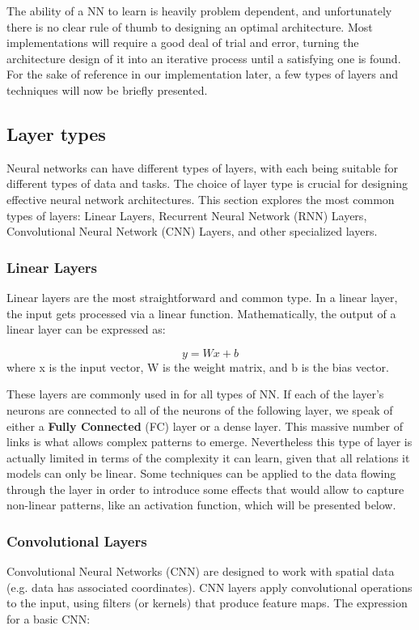 \documentclass[a4paper, 11pt]{report}
\begin{document}
The ability of a NN to learn is heavily problem dependent, and unfortunately there is no clear rule of thumb to designing an optimal architecture. Most implementations will require a good deal of trial and error, turning the architecture design of it into an iterative process until a satisfying one is found. For the sake of reference in our implementation later, a few types of layers and techniques will now be briefly presented.

\subsection{Layer types}
Neural networks can have different types of layers, with each being suitable for different types of data and tasks. The choice of layer type is crucial for designing effective neural network architectures. This section explores the most common types of layers: Linear Layers, Recurrent Neural Network (RNN) Layers, Convolutional Neural Network (CNN) Layers, and other specialized layers.
\subsubsection{Linear Layers}\label{Theory: Linear layers}
 Linear layers are the most straightforward and common type.  In a linear layer, the input gets processed via a linear function. Mathematically, the output of a linear layer can be expressed as:

 $$y=Wx+b$$
 where x is the input vector, W is the weight matrix, and b is the bias vector.

 These layers are commonly used in for all types of NN. If each of the layer's neurons are connected to all of the neurons of the following layer, we speak of either a \textbf{Fully Connected} (FC) layer or a dense layer. This massive number of links is what allows complex patterns to emerge. Nevertheless this type of layer is actually limited in terms of the complexity it can learn, given that all relations it models can only be linear. Some techniques can be applied to the data flowing through the layer in order to introduce some effects that would allow to capture non-linear patterns, like an activation function, which will be presented below.

\subsubsection{Convolutional Layers}\label{Theory: CNN layers}
 Convolutional Neural Networks (CNN) are designed to work with spatial data (e.g. data has associated coordinates). CNN layers apply convolutional operations to the input, using filters (or kernels) that produce feature maps. The expression for a basic CNN:
\end{document}
